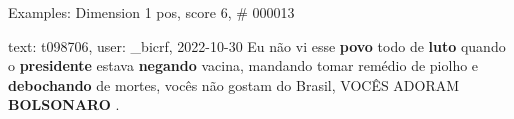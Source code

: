 \begin{frame}{Examples: Dimension 1 pos, score 6, \# 000013}
\footnotesize
\begin{exampleblock}{text: t098706, user: \_bicrf, 2022-10-30}
Eu não vi esse \textbf{povo} todo de \textbf{luto} quando o \textbf{presidente} 
estava \textbf{negando} vacina, mandando tomar remédio de piolho e 
\textbf{debochando} de mortes, vocês não gostam do Brasil, VOCÊS ADORAM 
\textbf{BOLSONARO} . 
\end{exampleblock}
\end{frame}
